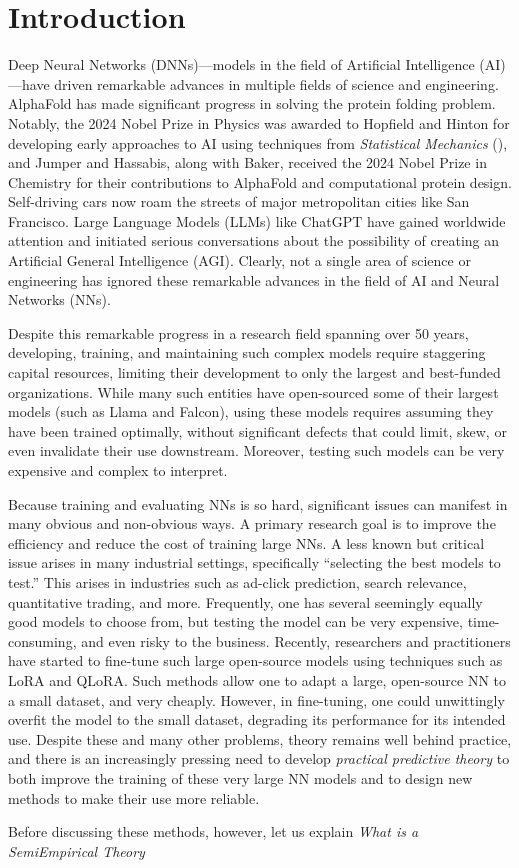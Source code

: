 
\section{Introduction}
\label{sxn:intro}
Deep Neural Networks (DNNs)—models in the field of Artificial Intelligence (AI)—have driven remarkable advances in multiple fields of science and engineering. AlphaFold has made significant progress in solving the protein folding problem.\cite{AlphaFold} Notably, the 2024 Nobel Prize in Physics was awarded to Hopfield and Hinton for developing early approaches to AI using techniques from \emph{Statistical Mechanics} (\STATMECH), and Jumper and Hassabis, along with Baker, received the 2024 Nobel Prize in Chemistry for their contributions to AlphaFold and computational protein design.\cite{Nobel2024Physics, Nobel2024Chemistry} Self-driving cars now roam the streets of major metropolitan cities like San Francisco. Large Language Models (LLMs) like ChatGPT have gained worldwide attention and initiated serious conversations about the possibility of creating an Artificial General Intelligence (AGI). Clearly, not a single area of science or engineering has ignored these remarkable advances in the field of AI and Neural Networks (NNs).

Despite this remarkable progress in a research field spanning over 50 years, developing, training, and maintaining such complex models require staggering capital resources, limiting their development to only the largest and best-funded organizations. While many such entities have open-sourced some of their largest models (such as Llama and Falcon), using these models requires assuming they have been trained optimally, without significant defects that could limit, skew, or even invalidate their use downstream. Moreover, testing such models can be very expensive and complex to interpret.

Because training and evaluating NNs is so hard, significant issues can manifest in many obvious and non-obvious ways. A primary research goal is to improve the efficiency and reduce the cost of training large NNs. A less known but critical issue arises in many industrial settings, specifically “selecting the best models to test.” This arises in industries such as ad-click prediction, search relevance, quantitative trading, and more. Frequently, one has several seemingly equally good models to choose from, but testing the model can be very expensive, time-consuming, and even risky to the business. Recently, researchers and practitioners have started to fine-tune such large open-source models using techniques such as LoRA and QLoRA. Such methods allow one to adapt a large, open-source NN to a small dataset, and very cheaply. However, in fine-tuning, one could unwittingly overfit the model to the small dataset, degrading its performance for its intended use. Despite these and many other problems, theory remains well behind practice, and there is an increasingly pressing need to develop \emph{practical predictive theory} to both improve the training of these very large NN models and to design new methods to make their use more reliable.

Before discussing these methods, however, let us explain \emph{What is a SemiEmpirical Theory}





%

